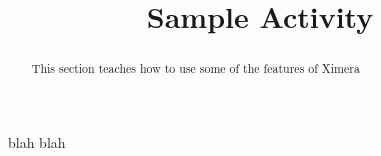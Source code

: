\documentclass{ximera}
\begin{document}
	\title{Sample Activity}
	\begin{abstract}
		This section teaches how to use some of the features of Ximera
	\end{abstract}
	
	blah blah
\end{document}
